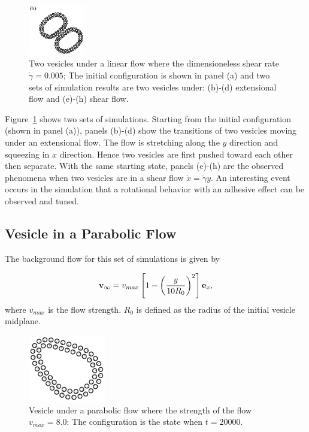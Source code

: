 \documentclass[lineno]{jfm}
\begin{document}
\begin{figure}
\begin{center}
\includegraphics[width=0.22\textwidth]{N116_shear_12000.eps}
\end{center}
  \caption{Two vesicles under a linear flow where the dimensioneless shear rate $\dot\gamma=0.005$; The initial configuration is shown in panel (a) and two sets of simulation results are two vesicles under: 
  (b)-(d) extensional flow and (e)-(h) shear flow. 
  }
    \label{figure5}
\end{figure}


Figure~\ref{figure5} shows two sets of simulations. Starting from the initial configuration (shown in panel (a)), panels (b)-(d) show the transitions of two vesicles moving under an extensional flow. The flow is stretching along the $y$ direction and squeezing in $x$ direction. Hence two vesicles are first pushed toward each other  then separate. With the same starting state, panels (e)-(h) are the observed phenomena when two vesicles are in a shear flow $\dot x = \dot\gamma y$. An interesting event occurs in the simulation that a rotational behavior with an adhesive effect can be observed and tuned.




\subsection{Vesicle in a Parabolic Flow}

The background flow for this set of simulations is given by

\begin{equation}
{\bf v}_\infty = v_{max}\left[ 1 - \left( \frac{y}{10R_0}\right)^2 \right]{\bf e}_x,
\end{equation}
%
where $v_{max}$ is the flow strength. $R_0$ is defined as the radius of the initial vesicle midplane.

\begin{figure}
\begin{center}
\includegraphics[width=0.3\textwidth]{N58_parabolic.eps}
\end{center}
  \caption{Vesicle under a parabolic flow where the strength of the flow $v_{max}=8.0$: 
The configuration is the state when $t=20000$.
  }
    \label{figure6}
\end{figure}
\end{document}
